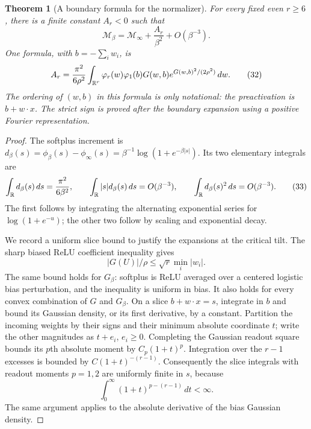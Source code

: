 \documentclass[11pt]{article}
\newtheorem{theorem}{Theorem}\newtheorem{lemma}[theorem]{Lemma}
\begin{document}
\begin{theorem}[A boundary formula for the normalizer]\label{thm:normalizer}
For every fixed even $r\ge6$, there is a finite constant $A_r<0$
such that
\[
          \mathcal M_\beta=\mathcal M_\infty
                                  +\frac{A_r}{\beta^2}+O(\beta^{-3}).
                                                               \tag{31}
\]
One formula, with $b=-\sum_iw_i$, is
\[
 A_r=\frac{\pi^2}{6\rho^2}\int_{\mathbb R^r}
       \varphi_r(w)\varphi_1(b)G(w,b)
                 e^{G(w,b)^2/(2\rho^2)}\,dw.             \tag{32}
\]
The ordering of $(w,b)$ in this formula is only notational: the
preactivation is $b+w\cdot x$. The strict sign is proved after the
boundary expansion using a positive Fourier representation.
\end{theorem}
\begin{proof}
The softplus increment is
$d_\beta(s)=\phi_\beta(s)-\phi_\infty(s)
=\beta^{-1}\log(1+e^{-\beta|s|})$.
Its two elementary integrals are
\[
 \int_\mathbb R d_\beta(s)\,ds=\frac{\pi^2}{6\beta^2},\qquad
 \int_\mathbb R |s|d_\beta(s)\,ds=O(\beta^{-3}),\qquad
 \int_\mathbb R d_\beta(s)^2\,ds=O(\beta^{-3}).               \tag{33}
\]
The first follows by integrating the alternating exponential series for
$\log(1+e^{-u})$; the other two follow by scaling and exponential decay.

We record a uniform slice bound to justify the expansions at the
critical tilt. The sharp biased ReLU coefficient inequality gives
\[
             |G(U)|/\rho\le\sqrt r\min_i|w_i|.
\]
The same bound holds for $G_\beta$: softplus is ReLU averaged over a
centered logistic bias perturbation, and the inequality is uniform in
bias. It also holds for every convex combination of $G$ and $G_\beta$.
On a slice $b+w\cdot x=s$, integrate in $b$ and bound its Gaussian
density, or its first derivative, by a constant. Partition the incoming
weights by their signs and their minimum absolute coordinate $t$;
write the other magnitudes as $t+e_i$, $e_i\ge0$. Completing the
Gaussian readout square bounds its $p$th absolute moment by
$C_p(1+t)^p$. Integration over the $r-1$ excesses is bounded by
$C(1+t)^{-(r-1)}$. Consequently the slice integrals with readout moments
$p=1,2$ are uniformly finite in $s$, because
\[
                  \int_0^\infty(1+t)^{p-(r-1)}\,dt<\infty.
                                                               \tag{34}
\]
The same argument applies to the absolute derivative of the bias
Gaussian density.


\end{proof}
\end{document}
